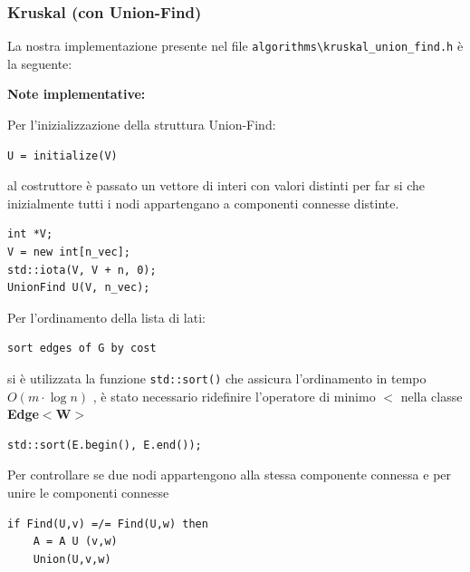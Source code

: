 \documentclass[]{article}
\begin{document}
\subsubsection{Kruskal (con Union-Find)}
\begin{flushleft}
La nostra implementazione presente nel file \verb|algorithms\kruskal_union_find.h| è la seguente:

\lstset{language=c++, style=mystyle}


\textbf{Note implementative:}

\medskip
Per l'inizializzazione della struttura Union-Find:

\begin{lstlisting}
U = initialize(V)
\end{lstlisting}

\smallskip
al costruttore è passato un vettore di interi con valori distinti per far si che inizialmente tutti i nodi appartengano a componenti connesse distinte.

\lstset{language=c++, style=mystyle, firstnumber=3}  	 	
\begin{lstlisting}
int *V;
V = new int[n_vec];
std::iota(V, V + n, 0);
UnionFind U(V, n_vec);
\end{lstlisting}

\medskip
Per l'ordinamento della lista di lati:

\begin{lstlisting}
sort edges of G by cost
\end{lstlisting}

\smallskip
si è utilizzata la funzione \verb|std::sort()| che assicura l'ordinamento in tempo $O(m\cdot\log n)$ 
, è stato necessario ridefinire l'operatore di minimo \textbf{$<$} nella classe \textbf{Edge$<$W$>$}
 
\lstset{language=c++, style=mystyle, firstnumber=7} 	 	
\begin{lstlisting}
std::sort(E.begin(), E.end());
\end{lstlisting}

\medskip
Per controllare se due nodi appartengono alla stessa componente connessa e per unire le componenti connesse
\begin{lstlisting}
if Find(U,v) =/= Find(U,w) then
	A = A U (v,w)
	Union(U,v,w)
\end{lstlisting}


\end{flushleft}
\end{document}
